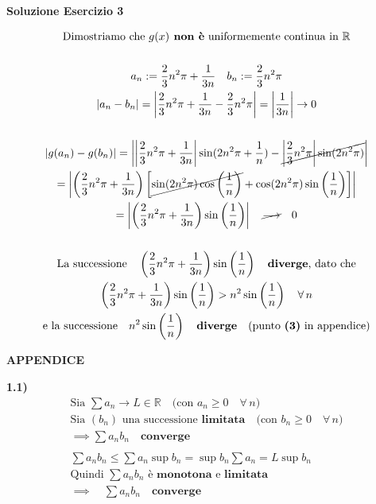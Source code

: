\documentclass[11pt,reqno]{amsart}
\begin{document}
\newpage

\centerline{\bf Soluzione Esercizio 3 }

\bigskip

\begin{gather*}
 \text{Dimostriamo che } g(x) \textbf{ non è} \text{ uniformemente continua in } \mathbb{R}\\\\
 a_n := \frac{2}{3}n^2\pi + \frac{1}{3n} \quad b_n := \frac{2}{3}n^2\pi\\
 |a_n - b_n| = \left|\frac{2}{3}n^2\pi + \frac{1}{3n} - \frac{2}{3}n^2\pi\right| = \left|\frac{1}{3n}\right| \to 0\\\\
 |g(a_n) - g(b_n)| = \left|\left|\frac{2}{3}n^2\pi + \frac{1}{3n}\right|\sin(2n^2\pi + \frac{1}{n}) - \cancel{\left|\frac{2}{3}n^2\pi\right|\sin(2n^2\pi)}\right|\\
 = \left|\left(\frac{2}{3}n^2\pi + \frac{1}{3n}\right)\left[\cancel{\sin(2n^2\pi)\cos\left(\frac{1}{n}\right)}+\cos(2n^2\pi)\sin\left(\frac{1}{n}\right)\right]\right|\\
 = \left|\left(\frac{2}{3}n^2\pi + \frac{1}{3n}\right)\sin\left(\frac{1}{n}\right)\right| \quad \cancel{\longrightarrow} \quad 0\\\\
 \text{La successione} \quad \left(\frac{2}{3}n^2\pi + \frac{1}{3n}\right)\sin\left(\frac{1}{n}\right) \quad \textbf{diverge} \text{, dato che}\\
 \left(\frac{2}{3}n^2\pi + \frac{1}{3n}\right)\sin\left(\frac{1}{n}\right) > n^2\sin\left(\frac{1}{n}\right) \quad \forall \, n\\
 \text{e la successione} \quad n^2\sin\left(\frac{1}{n}\right) \quad \textbf{diverge} \quad \text{(punto } \textbf{(3)} \text{ in appendice)}
\end{gather*}

\newpage

\centerline{\bf APPENDICE }

\iffalse
{\bf 1.1)}
\begin{gather*}
 \text{Sia } \sum a_n \to L \in \mathbb{R} \quad \text{(con } a_n \geq 0 \quad \forall \, n \text{)}\\
 \text{Sia } (b_n) \text{ una successione } \textbf{limitata} \quad \text{(con } b_n \geq 0 \quad \forall \, n \text{)}\\
 \implies \sum a_nb_n \quad \textbf{converge}\\\\
 \sum a_nb_n \leq \sum a_n\sup b_n = \sup b_n \sum a_n = L\sup b_n\\
 \text{Quindi } \sum a_nb_n \text{ è } \textbf{monotona} \text{ e } \textbf{limitata}\\
 \implies \quad \sum a_nb_n \quad \textbf{converge}
\end{gather*}
\end{document}
